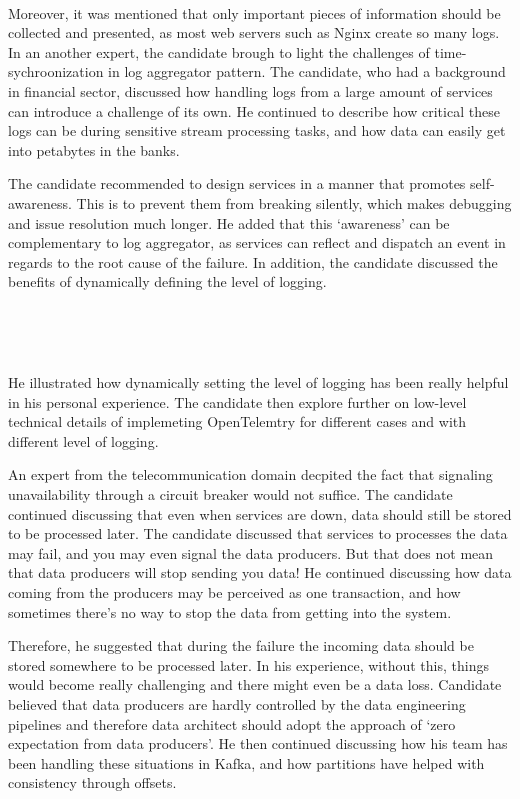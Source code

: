 \documentclass{bmcart}
\begin{document}
\,

Moreover, it was mentioned that only important pieces of information should be collected and presented, as most web servers such as Nginx create so many logs. In an another expert, the candidate brough to light the challenges of time-sychroonization in log aggregator pattern. The candidate, who had a background in financial sector, discussed how handling logs from a large amount of services can introduce a challenge of its own. He continued to describe how critical these logs can be during sensitive stream processing tasks, and how data can easily get into petabytes in the banks. 

The candidate recommended to design services in a manner that promotes self-awareness. This is to prevent them from breaking silently, which makes debugging and issue resolution much longer. He added that this `awareness' can be complementary to log aggregator, as services can reflect and dispatch an event in regards to the root cause of the failure. In addition, the candidate discussed the benefits of dynamically defining the level of logging. 

\,

\setlength{\fboxsep}{0.7em}
\noindent{}

\,

He illustrated how dynamically setting the level of logging has been really helpful in his personal experience. The candidate then explore further on low-level technical details of implemeting OpenTelemtry for different cases and with different level of logging.  

An expert from the telecommunication domain decpited the fact that signaling unavailability through a circuit breaker would not suffice. The candidate continued discussing that even when services are down, data should still be stored to be processed later. The candidate discussed that services to processes the data may fail, and you may even signal the data producers. But that does not mean that data producers will stop sending you data! He continued discussing how data coming from the producers may be perceived as one transaction, and how sometimes there's no way to stop the data from getting into the system. 


Therefore, he suggested that during the failure the incoming data should be stored somewhere to be processed later. In his experience, without this, things would become really challenging and there might even be a data loss. Candidate believed that data producers are hardly controlled by the data engineering pipelines and therefore data architect should adopt the approach of `zero expectation from data producers'. He then continued discussing how his team has been handling these situations in Kafka, and how partitions have helped with consistency through offsets. 
\end{document}
